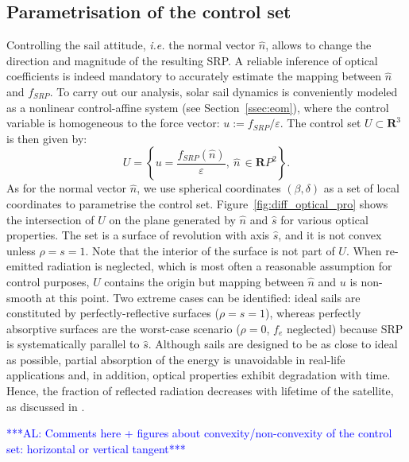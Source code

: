 \documentclass[AMA,STIX1COL]{WileyNJD-v2}
\newcommand{\uvect}[1]{\hat{#1}}
\newcommand{\vect}[1]{#1}
\renewcommand{\epsilon}{\varepsilon}
\newcommand{\R}{\mathbf{R}}
\newcommand{\bluetext}{\textcolor{blue}}
\newcommand{\com}[1]{\bluetext{***#1***}}
\begin{document}
\subsection{Parametrisation of the control set}
Controlling the sail attitude, \textit{i.e.} the normal vector $\uvect{n}$, allows to change the direction and magnitude of the resulting \ac{SRP}. A reliable inference of optical coefficients is indeed mandatory to accurately estimate the mapping between $\uvect{n}$ and $\vect{f}_{SRP}$.
%
To carry out our analysis, solar sail dynamics is conveniently modeled as a nonlinear control-affine system
(see Section~\ref{ssec:eom}), where the control variable is homogeneous to the force vector: $\vect{u} :=
\vect{f}_{SRP}/\epsilon$. The control set ${U} \subset \mathbf{R}^3$ is then given by:
\begin{equation}
	{U} = \left\{ \vect{u} = \dfrac{\vect{f}_{SRP}(\uvect{n})}{\epsilon} , \ \uvect{n} \,\in \R P^2 \right\}.
	\label{eq:control_set}
\end{equation}
As for the normal vector $\uvect{n}$, we use spherical coordinates $(\beta,\delta)$ as a set of
local coordinates to parametrise the control set.
%
Figure~\ref{fig:diff_optical_pro} shows the intersection of ${U}$ on the plane generated by $\uvect{n}$ and $\uvect{s}$
for various optical properties. The set is a surface of revolution with axis $\uvect{s}$, and it is not convex unless
$\rho = s = 1$. Note that the interior of the surface is not part of ${U}$. When re-emitted radiation is neglected,
which is most often a reasonable assumption for control purposes, ${U}$ contains the origin but mapping between
$\uvect{n}$ and $\vect{u}$ is non-smooth at this point. Two extreme cases can be identified: ideal sails are constituted
by perfectly-reflective surfaces ($\rho = s = 1$), whereas perfectly absorptive surfaces are the worst-case scenario
($\rho = 0$, $\vect{f}_e$ neglected) because \ac{SRP} is systematically parallel to $\uvect{s}$.  Although sails are
designed to be as close to ideal as possible, partial absorption of the energy is unavoidable in real-life applications and, in addition, optical properties exhibit degradation with time. Hence, the fraction of reflected radiation decreases with lifetime of the satellite, as discussed in \cite{dachwald_impact_2007, Niccolai_2022}.

\com{AL: Comments here + figures about convexity/non-convexity of the control set:
horizontal or vertical tangent}
\end{document}

